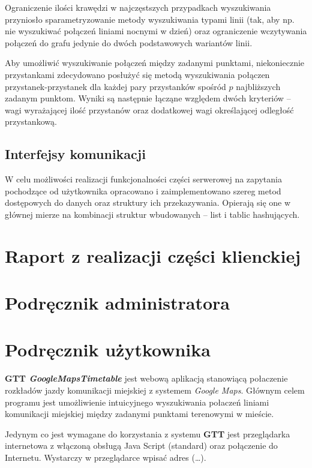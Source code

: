 \documentclass[a4paper,12pt]{article}
\begin{document}
  Ograniczenie ilości krawędzi w najczęstszych przypadkach wyszukiwania
  przyniosło sparametryzowanie metody wyszukiwania typami linii (tak, aby np.
  nie wyszukiwać połączeń liniami nocnymi w dzień) oraz ograniczenie
  wczytywania połączeń do grafu jedynie do dwóch podstawowych wariantów linii.
  
  Aby umożliwić wyszukiwanie połączeń między zadanymi punktami, niekoniecznie
  przystankami zdecydowano posłużyć się metodą wyszukiwania połączen
  przystanek-przystanek dla każdej pary przystanków spośród $p$ najbliższych
  zadanym punktom. Wyniki są następnie łącząne względem dwóch kryteriów -- wagi
  wyrażającej ilość przystanów oraz dodatkowej wagi określającej odległość
  przystankową.
  
  \subsection{Interfejsy komunikacji}
  W celu możliwości realizacji funkcjonalności części serwerowej na zapytania
  pochodzące od użytkownika opracowano i zaimplementowano szereg metod
  dostępowych do danych oraz struktury ich przekazywania. Opierają się one w
  głównej mierze na kombinacji struktur wbudowanych -- list i tablic
  hashujących. 


\section{Raport z realizacji  części klienckiej} 

\section{Podręcznik administratora}
\section{Podręcznik użytkownika}

 \textbf{GTT \emph{GoogleMapsTimetable}} jest webową aplikacją stanowiącą
 połaczenie rozkładów jazdy komunikacji miejskiej z systemem \emph{Google
 Maps}. Głównym celem programu jest umożliwienie intuicyjnego wyszukiwania
 połaczeń liniami komunikacji miejskiej między zadanymi punktami terenowymi w
 mieście. 
 
 Jedynym co jest wymagane do korzystania z systemu \textbf{GTT} jest
 przeglądarka internetowa z włączoną obsługą Java Script (standard) oraz
 połączenie do Internetu. Wystarczy w przeglądarce wpisać adres (\ldots).
\end{document}
